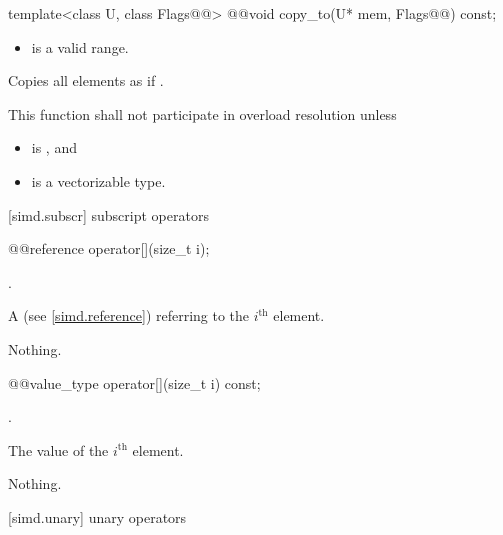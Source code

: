 \begin{itemdecl}
template<class U, class Flags@@> @@void copy_to(U* mem, Flags@\wgAdd{ = \{\}}@) const;
\end{itemdecl}

\begin{itemdescr}
  \pnum\requires
  \begin{itemize}
    \item \tcode{[mem, mem + size())} is a valid range.
  \end{itemize}

  \pnum\effects
  Copies all  elements as if  \foralli.

  \pnum\remarks
  This function shall not participate in overload resolution unless
  \begin{itemize}
    \item {} is , and
    \item {} is a vectorizable type.
  \end{itemize}
\end{itemdescr}

[simd.subscr]{ subscript operators}

\begin{itemdecl}
@@reference operator[](size_t i);
\end{itemdecl}

\begin{itemdescr}
  \pnum\requires
  .

  \pnum\returns
  A  (see \ref{simd.reference}) referring to the $i^\text{th}$ element.

  \pnum\throws Nothing.
\end{itemdescr}

\begin{itemdecl}
@@value_type operator[](size_t i) const;
\end{itemdecl}

\begin{itemdescr}
  \pnum\requires
  .

  \pnum\returns
  The value of the $i^\text{th}$ element.

  \pnum\throws Nothing.
\end{itemdescr}

[simd.unary]{ unary operators}

